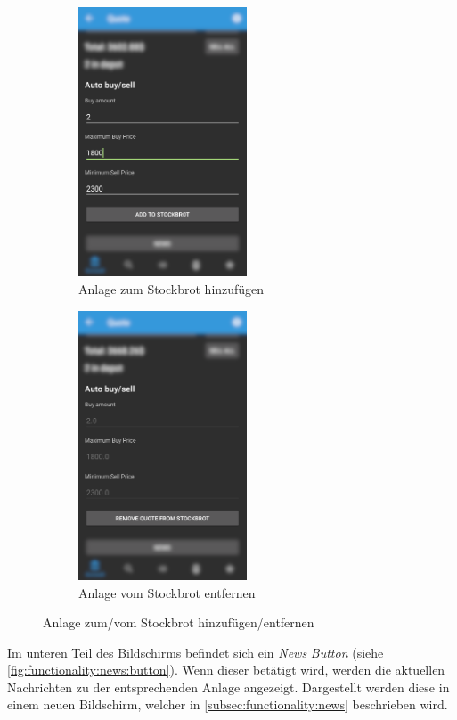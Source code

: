 \documentclass[a4paper]{article}
\begin{document}
\begin{figure}[H]
    \begin{subfigure}{.5\textwidth}
        \centering
        \includegraphics[height=8cm,keepaspectratio]{./images/stockbrot_add_before.png}
        \caption{Anlage zum Stockbrot hinzufügen}
        \label{fig:functionality:stockbrot:add}
    \end{subfigure}
    \begin{subfigure}{.5\textwidth}
        \centering
        \includegraphics[height=8cm,keepaspectratio]{./images/stockbrot_add_after.png}
        \caption{Anlage vom Stockbrot entfernen}
        \label{fig:functionality:stockbrot:remove}
    \end{subfigure}
    \caption{Anlage zum/vom Stockbrot hinzufügen/entfernen}
    \label{fig:functionality:stockbrot:addremove}
\end{figure}

Im unteren Teil des Bildschirms befindet sich ein \textit{News} \textit{Button} (siehe \autoref{fig:functionality:news:button}).
Wenn dieser betätigt wird, werden die aktuellen Nachrichten zu der entsprechenden Anlage angezeigt.
Dargestellt werden diese in einem neuen Bildschirm, welcher in \autoref{subsec:functionality:news} beschrieben wird.
\end{document}
